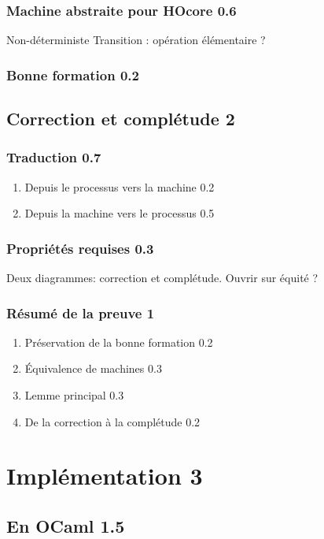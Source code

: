 \documentclass[11pt]{article}
\newcounter{c_theo}
\newcounter{c_def}
\begin{document}
\subsubsection{Machine abstraite pour HOcore 0.6}
\label{sec-3-1-2}
Non-déterministe
Transition : opération élémentaire ?
\subsubsection{Bonne formation 0.2}
\label{sec-3-1-3}
\subsection{Correction et complétude 2}
\label{sec-3-2}
\subsubsection{Traduction 0.7}
\label{sec-3-2-1}
\begin{enumerate}
\item Depuis le processus vers la machine 0.2
\label{sec-3-2-1-1}
\item Depuis la machine vers le processus 0.5
\label{sec-3-2-1-2}
\end{enumerate}
\subsubsection{Propriétés requises 0.3}
\label{sec-3-2-2}
Deux diagrammes: correction et complétude. Ouvrir sur équité ?
\subsubsection{Résumé de la preuve 1}
\label{sec-3-2-3}
\begin{enumerate}
\item Préservation de la bonne formation 0.2
\label{sec-3-2-3-1}
\item Équivalence de machines 0.3
\label{sec-3-2-3-2}
\item Lemme principal 0.3
\label{sec-3-2-3-3}
\item De la correction à la complétude 0.2
\label{sec-3-2-3-4}
\end{enumerate}


\section{Implémentation 3}
\label{sec-4}
\subsection{En OCaml 1.5}
\label{sec-4-1}
\end{document}
